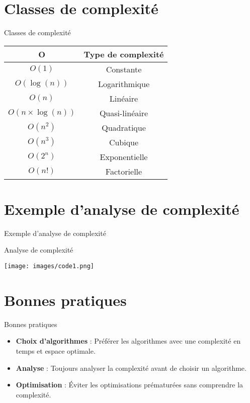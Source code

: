 \documentclass{clbeamer2024}
\begin{document}
\section{Classes de complexité}
\begin{frame}{Classes de complexité}
	\begin{center}
		\begin{tabular}{|c|c|}
			\hline
			\textbf{O} & \textbf{Type de complexité} \\
			\hline
			\(O(1)\) & Constante \\
			\hline
			\(O(\log(n))\) & Logarithmique \\
			\hline
			\(O(n)\) & Linéaire \\
			\hline
			\(O(n \times \log(n))\) & Quasi-linéaire \\
			\hline
			\(O(n^2)\) & Quadratique \\
			\hline
			\(O(n^3)\) & Cubique \\
			\hline
			\(O(2^n)\) & Exponentielle \\
			\hline
			\(O(n!)\) & Factorielle \\
			\hline
		\end{tabular}
	\end{center}
\end{frame}


\section{Exemple d'analyse de complexité}
\begin{frame}{Exemple d'analyse de complexité}
	\begin{exampleblock}{Analyse de complexité}
		\begin{center}
			\texttt{[image: images/code1.png]}
		\end{center}
	
	\end{exampleblock}
\end{frame}


\section{Bonnes pratiques}
\begin{frame}{Bonnes pratiques}
	\begin{itemize}
		\item \textbf{Choix d'algorithmes} : Préférer les algorithmes avec une complexité en temps et espace optimale.
		\item \textbf{Analyse} : Toujours analyser la complexité avant de choisir un algorithme.
		\item \textbf{Optimisation} : Éviter les optimisations prématurées sans comprendre la complexité.
	\end{itemize}
\end{frame}
\end{document}
